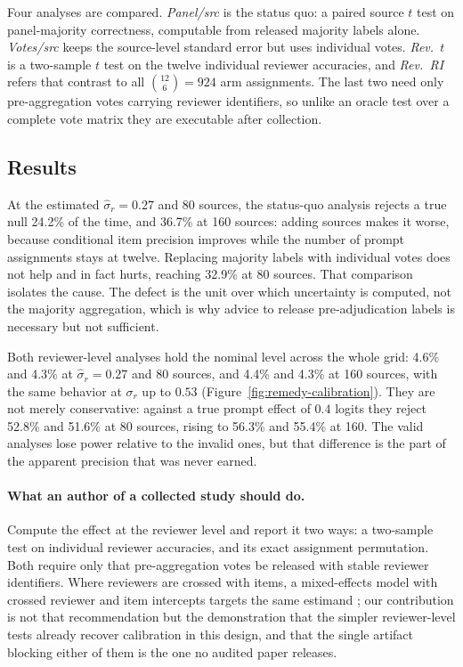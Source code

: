 \documentclass[11pt]{article}
\begin{document}
Four analyses are compared. \emph{Panel/src} is the status quo: a paired source
$t$ test on panel-majority correctness, computable from released majority
labels alone. \emph{Votes/src} keeps the source-level standard error but uses
individual votes. \emph{Rev.\ $t$} is a two-sample $t$ test on the twelve
individual reviewer accuracies, and \emph{Rev.\ RI} refers that contrast to all
$\binom{12}{6}=924$ arm assignments. The last two need only pre-aggregation
votes carrying reviewer identifiers, so unlike an oracle test over a complete
vote matrix they are executable after collection.




\subsection{Results}

At the estimated $\hat\sigma_r=0.27$ and 80 sources, the status-quo analysis
rejects a true null 24.2\% of the time, and 36.7\% at 160 sources: adding
sources makes it worse, because conditional item precision improves while the
number of prompt assignments stays at twelve. Replacing majority labels with
individual votes does not help and in fact hurts, reaching 32.9\% at 80
sources. That comparison isolates the cause. The defect is the unit over which
uncertainty is computed, not the majority aggregation, which is why advice to
release pre-adjudication labels is necessary but not sufficient.

Both reviewer-level analyses hold the nominal level across the whole grid:
4.6\% and 4.3\% at $\hat\sigma_r=0.27$ and 80 sources, and 4.4\% and 4.3\% at
160 sources, with the same behavior at $\sigma_r$ up to $0.53$
(Figure~\ref{fig:remedy-calibration}). They are not merely conservative:
against a true prompt effect of $0.4$ logits they reject 52.8\% and 51.6\% at
80 sources, rising to 56.3\% and 55.4\% at 160. The valid analyses lose power
relative to the invalid ones, but that difference is the part of the apparent
precision that was never earned.

\paragraph{What an author of a collected study should do.}
Compute the effect at the reviewer level and report it two ways: a two-sample
test on individual reviewer accuracies, and its exact assignment permutation.
Both require only that pre-aggregation votes be released with stable reviewer
identifiers. Where reviewers are crossed with items, a mixed-effects model
with crossed reviewer and item intercepts targets the same estimand
\citep{baayen2008crossed,barr2013maximal}; our contribution is not that
recommendation but the demonstration that the simpler reviewer-level tests
already recover calibration in this design, and that the single artifact
blocking either of them is the one no audited paper releases.
\end{document}
